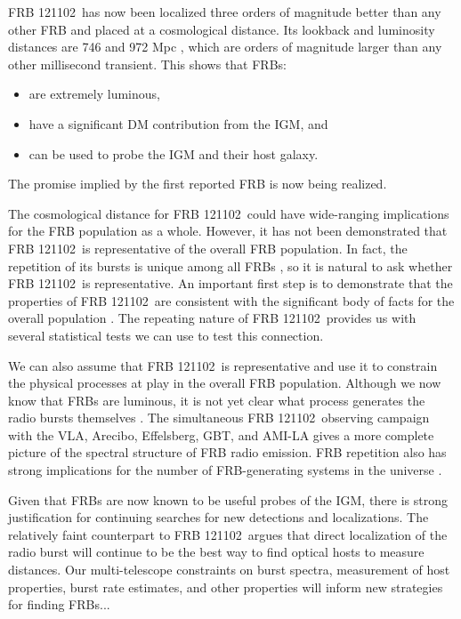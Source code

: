 \documentclass[twocolumn]{aastex61}
\newcommand{\frb}{FRB 121102}
\begin{document}
\frb\ has now been localized three orders of magnitude better than any other FRB and placed at a cosmological distance. Its lookback and luminosity distances are 746 and 972 Mpc \citep{planck15}, which are orders of magnitude larger than any other millisecond transient. This shows that FRBs:
\begin{itemize}
 \item are extremely luminous, 
 \item have a significant DM contribution from the IGM, and
 \item can be used to probe the IGM and their host galaxy.
\end{itemize}
The promise implied by the first reported FRB \citep{2007Sci...318..777L} is now being realized.

The cosmological distance for \frb\ could have wide-ranging implications for the FRB population as a whole. However, it has not been demonstrated that \frb\ is representative of the overall FRB population. In fact, the repetition of its bursts is unique among all FRBs \citep{2015MNRAS.454..457P}, so it is natural to ask whether \frb\ is representative. An important first step is to demonstrate that the properties of \frb\ are consistent with the significant body of facts for the overall population \citep{2015MNRAS.451.3278M, 2016MPLA...3130013K}. The repeating nature of \frb\ provides us with several statistical tests we can use to test this connection.

We can also assume that \frb\ is representative and use it to constrain the physical processes at play in the overall FRB population. Although we now know that FRBs are luminous, it is not yet clear what process generates the radio bursts themselves \citep{2014PhRvD..89j3009K, 2014ApJ...785L..26L, 2016MNRAS.457..232C}. The simultaneous \frb\ observing campaign with the VLA, Arecibo, Effelsberg, GBT, and AMI-LA gives a more complete picture of the spectral structure of FRB radio emission. FRB repetition also has strong implications for the number of FRB-generating systems in the universe \citep{2016MNRAS.458L..89C}.

Given that FRBs are now known to be useful probes of the IGM, there is strong justification for continuing searches for new detections and localizations. The relatively faint counterpart to \frb\ argues that direct localization of the radio burst will continue to be the best way to find optical hosts to measure distances. Our multi-telescope constraints on burst spectra, measurement of host properties, burst rate estimates, and other properties will inform new strategies for finding FRBs...
\end{document}
